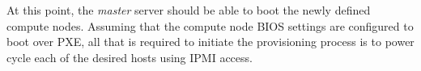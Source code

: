 At this point, the {\em master} server should be able to boot the newly defined
compute nodes. Assuming that the compute node BIOS settings are configured
to boot over PXE, all that is required to initiate the provisioning process is to power
cycle each of the desired hosts using IPMI access.
